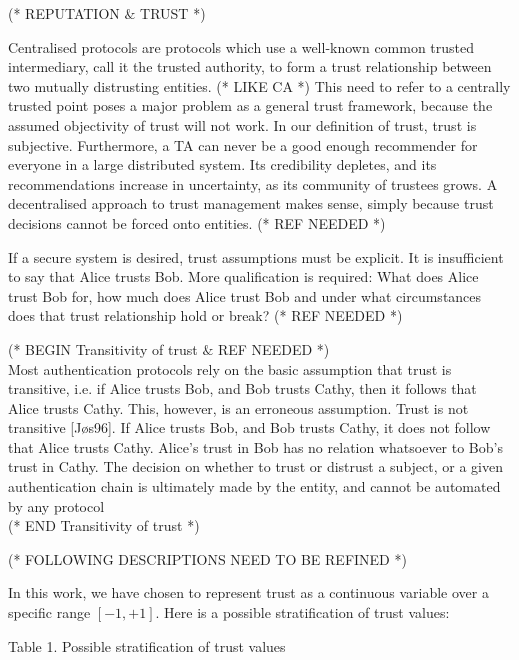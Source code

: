 \documentclass{article}
\begin{document}
(* REPUTATION $\&$ TRUST *)



Centralised protocols are protocols which use a well-known common trusted intermediary, call it the trusted authority, to form a trust relationship
between two mutually distrusting entities. (* LIKE CA *) This need to refer to a centrally trusted point poses a major problem as a general trust
framework, because the assumed objectivity of trust will not work. In our definition of trust, trust is subjective. Furthermore, a TA can never be
a good enough recommender for everyone in a large distributed system. Its credibility depletes, and its recommendations increase in uncertainty,
as its community of trustees grows. A decentralised approach to trust management makes sense, simply because trust decisions cannot be forced onto
entities. (* REF NEEDED *)



If a secure system is desired, trust assumptions must be explicit. It is insufficient to say that Alice trusts Bob. More qualification is required:
What does Alice trust Bob for, how much does Alice trust Bob and under what circumstances does that trust relationship hold or break? (* REF NEEDED
*)



(* BEGIN Transitivity of trust $\&$ REF NEEDED *)\\
Most authentication protocols rely on the basic assumption that trust is transitive, i.e. if Alice trusts Bob, and Bob trusts Cathy, then it follows
that Alice trusts Cathy. This, however, is an erroneous assumption. Trust is not transitive [J{\o}s96]. If Alice trusts Bob, and Bob trusts Cathy,
it does not follow that Alice trusts Cathy. Alice's trust in Bob has no relation whatsoever to Bob's trust in Cathy. The decision on whether to trust
or distrust a subject, or a given authentication chain is ultimately made by the entity, and cannot be automated by any protocol\\
(* END Transitivity of trust *)



(* FOLLOWING DESCRIPTIONS NEED TO BE REFINED *)



In this work, we have chosen to represent trust as a continuous variable over a specific range \([-1, +1]\). Here is a possible stratification of
trust values:


\caption{Table 1. Possible stratification of trust values} 
\end{document}
